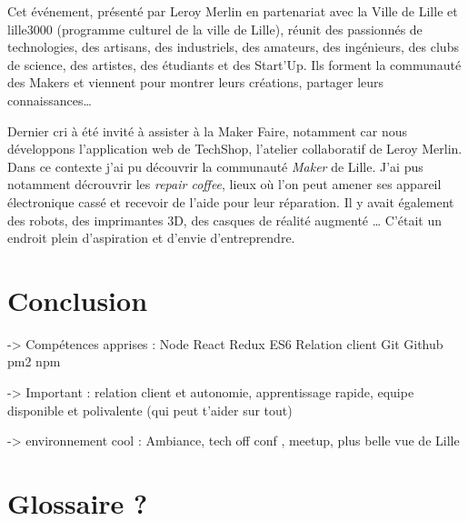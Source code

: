 \documentclass[12pt,a4paper]{article}
\begin{document}
  \bigskip

  Cet événement, présenté par Leroy Merlin en partenariat avec la Ville de
  Lille et lille3000 (programme culturel de la ville de Lille), réunit des
  passionnés de technologies, des artisans, des industriels, des amateurs,
  des ingénieurs, des clubs de science, des artistes, des étudiants et des
  Start'Up. Ils forment la communauté des Makers et viennent pour montrer
  leurs créations, partager leurs connaissances\ldots{}

  \bigskip

  Dernier cri à été invité à assister à la Maker Faire, notamment car nous
  développons l'application web de TechShop, l'atelier collaboratif de
  Leroy Merlin. Dans ce contexte j'ai pu découvrir la communauté
  \emph{Maker} de Lille. J'ai pus notamment décrouvrir les \emph{repair
  coffee}, lieux où l'on peut amener ses appareil électronique cassé et
  recevoir de l'aide pour leur réparation. Il y avait également des
  robots, des imprimantes 3D, des casques de réalité augmenté \ldots{}
  C'était un endroit plein d'aspiration et d'envie d'entreprendre.

  \newpage

  \section{Conclusion}\label{conclusion-2}

  -\textgreater{} Compétences apprises : Node React Redux ES6 Relation
  client Git Github pm2 npm

  -\textgreater{} Important : relation client et autonomie, apprentissage
  rapide, equipe disponible et polivalente (qui peut t'aider sur tout)

  -\textgreater{} environnement cool : Ambiance, tech off conf , meetup,
  plus belle vue de Lille

  \newpage

  \section{Glossaire ?}\label{glossaire}
\end{document}
